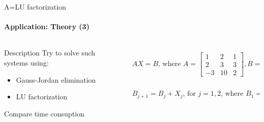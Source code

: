 \documentclass[aspectratio=169]{beamer}
\begin{document}
    \begin{frame}[t]{A=LU factorization}
    \framesubtitle{Application: Theory (3)}
    \vspace{-0.6cm}
    \begin{columns}[T,onlytextwidth]
        \begin{column}{0.49\textwidth}
            \begin{block}{Description}
                Try to solve such systems using:
                \begin{itemize}
                    \item Gauss-Jordan elimination 
                    \item LU factorization
                \end{itemize}
                Compare time consuption
            \end{block}
        \end{column}
        \begin{column}{0.49\textwidth}
            \begin{eqnarray*}
                AX=B \text{, where } A = \begin{bmatrix}
                1 & 2 & 1 \\
                2 & 3 & 3 \\ 
                -3 & 10  & 2 
                \end{bmatrix}, B = \begin{bmatrix}
                    k_1\\k_2\\k_3
                \end{bmatrix} \\
                B_{j+1} = B_j + X_j \text{, for $j=1,2$, where }B_1= \begin{bmatrix}
                    1\\1\\1
                \end{bmatrix}
            \end{eqnarray*}
        \end{column}
    \end{columns}
    \vspace{-0.8cm}
\end{frame}
\end{document}
